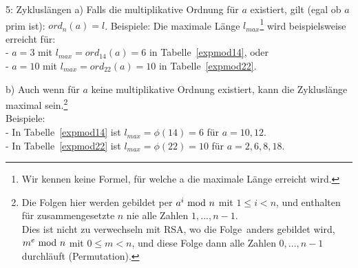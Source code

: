 \begin{refsegment}
\begin{example}{ 5: Zykluslängen}
\noindent a) Falls die multiplikative Ordnung für $a$ existiert, gilt (egal
ob $a$ prim ist): $ord_{n}(a) = l$.
\indent Beispiele: Die maximale Länge $l_{max}$\footnote{%
            Wir kennen keine Formel, für welche a die maximale Länge erreicht wird.}
wird beispielsweise erreicht für:\\
\indent  - $a=3$ mit $l_{max} = ord_{14}(a) = 6$ in Tabelle~\ref{expmod14}, oder\\
\indent  - $a=10$ mit $l_{max} = ord_{22}(a) = 10$ in Tabelle~\ref{expmod22}.

\noindent b) Auch wenn für $a$ keine multiplikative Ordnung existiert, kann
die Zykluslänge maximal sein.\footnote{%
         Die Folgen hier werden gebildet per $a^i{\rm ~mod~}n$ mit $1\leq i<n$,
         und enthalten für zusammengesetzte $n$ nie alle Zahlen $1, ..., n-1$.\\
         Dies ist nicht zu verwechseln mit RSA, wo die \glqq Folge\grqq~anders
         gebildet wird,  $m^e{\rm ~mod~}n$ mit $0\leq m<n$, und diese Folge
         dann alle Zahlen $0, ..., n-1$ durchläuft (Permutation).
}\\
\indent Beispiele:\\
\indent  - In Tabelle~\ref{expmod14} ist $l_{max}=\phi(14)=6$ für $a=10, 12$.\\
\indent  - In Tabelle~\ref{expmod22} ist $l_{max}=\phi(22)=10$ für $a=2, 6, 8, 18$.

\end{example}




\end{refsegment}
